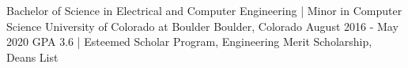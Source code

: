 

\begin{cventries}

  \cventry
    {Bachelor of Science in Electrical and Computer Engineering | Minor in Computer Science} %
    {University of Colorado at Boulder} %
    {Boulder, Colorado} %
    {August 2016 - May 2020} %
    {GPA 3.6 | Esteemed Scholar Program, Engineering Merit Scholarship, Deans List}
\end{cventries}
